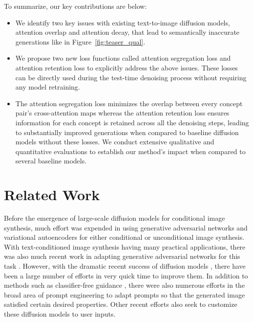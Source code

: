 \documentclass[10pt,twocolumn,letterpaper]{article}
\begin{document}
\vspace{10pt}
\noindent To summarize, our key contributions are below:
\begin{itemize}
[leftmargin=*, noitemsep]
    \item We identify two key issues with existing text-to-image diffusion models, attention overlap and attention decay, that lead to semantically inaccurate generations like in Figure~\ref{fig:teaser_qual}.
    \item We propose two new loss functions called attention segregation loss and attention retention loss to explicitly address the above issues. These losses can be directly used during the test-time denoising process without requiring any model retraining. 
    \item The attention segregation loss minimizes the overlap between every concept pair's cross-attention maps whereas the attention retention loss ensures information for each concept is retained across all the denoising steps, leading to substantially improved generations when compared to baseline diffusion models without these losses. We conduct extensive qualitative and quantitative evaluations to establish our method's impact when compared to several baseline models.
    
\end{itemize}

\section{Related Work}
Before the emergence of large-scale diffusion models for conditional image synthesis, much effort was expended in using generative adversarial networks \cite{isola2017image,zhu2017unpaired,zhu2017toward,park2019semantic,karras2019style} and variational autoencoders \cite{huang2018introvae} for either conditional or unconditional image synthesis. With text-conditioned image synthesis having many practical applications, there was also much recent work in adapting generative adversarial networks for this task \cite{tao2022df, xu2018attngan, ye2021improving, zhang2021cross, zhu2019dm}. However, with the dramatic recent success of diffusion models \cite{nichol2021glide, rombach2022high, saharia2022photorealistic, ramesh2022hierarchical}, there have been a large number of efforts in very quick time to improve them. In addition to methods such as classifier-free guidance \cite{ho2022classifier}, there were also numerous efforts in the broad area of prompt engineering \cite{liu2022design, wang2022diffusiondb, witteveen2022investigating, hao2022optimizing} to adapt prompts so that the generated image satisfied certain desired properties. Other recent efforts also seek to customize these diffusion models \cite{yang2022reco,li2023gligen,zeng2022scenecomposer,brooks2022instructpix2pix, mokady2022null} to user inputs.
\end{document}
